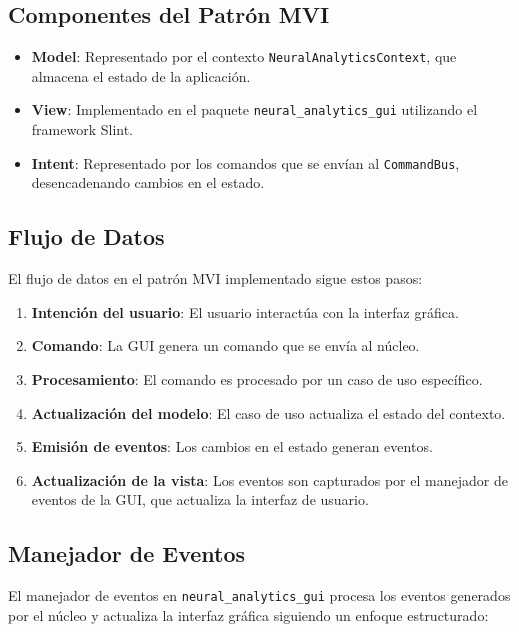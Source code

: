 \subsection{Componentes del Patrón MVI}

\begin{itemize}
    \item \textbf{Model}: Representado por el contexto \texttt{NeuralAnalyticsContext}, que almacena el estado de la aplicación.
    \item \textbf{View}: Implementado en el paquete \texttt{neural\_analytics\_gui} utilizando el framework Slint.
    \item \textbf{Intent}: Representado por los comandos que se envían al \texttt{CommandBus}, desencadenando cambios en el estado.
\end{itemize}

\subsection{Flujo de Datos}

El flujo de datos en el patrón MVI implementado sigue estos pasos:

\begin{enumerate}
    \item \textbf{Intención del usuario}: El usuario interactúa con la interfaz gráfica.
    \item \textbf{Comando}: La GUI genera un comando que se envía al núcleo.
    \item \textbf{Procesamiento}: El comando es procesado por un caso de uso específico.
    \item \textbf{Actualización del modelo}: El caso de uso actualiza el estado del contexto.
    \item \textbf{Emisión de eventos}: Los cambios en el estado generan eventos.
    \item \textbf{Actualización de la vista}: Los eventos son capturados por el manejador de eventos de la GUI, que actualiza la interfaz de usuario.
\end{enumerate}

\subsection{Manejador de Eventos}

El manejador de eventos en \texttt{neural\_analytics\_gui} procesa los eventos generados por el núcleo y actualiza la interfaz gráfica siguiendo un enfoque estructurado:

